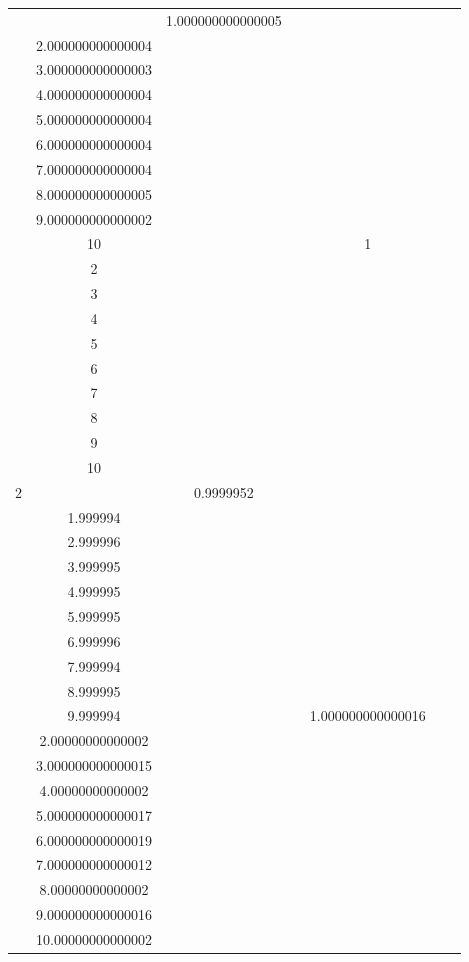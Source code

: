\documentclass[oneside, final, 12pt]{extarticle}
\begin{document}
\begin{longtable}{|c|c|c|c|c|c|c|}
& \( \begin{aligned}
& 1.000000000000005 \\ & 2.000000000000004 \\ & 3.000000000000003 \\ & 4.000000000000004 \\ & 5.000000000000004 \\ & 6.000000000000004 \\ & 7.000000000000004 \\ & 8.000000000000005 \\ & 9.000000000000002 \\ & 10 
\end{aligned} \)
& \( \begin{aligned}  \end{aligned} \) 
& \( \begin{aligned}
& 1 \\ & 2 \\ & 3 \\ & 4 \\ & 5 \\ & 6 \\ & 7 \\ & 8 \\ & 9 \\ & 10 
\end{aligned} \)
& \( \begin{aligned}  \end{aligned} \) 
\\ \hline
    \(2\) & \( \begin{aligned}
& 0.9999952 \\ & 1.999994 \\ & 2.999996 \\ & 3.999995 \\ & 4.999995 \\ & 5.999995 \\ & 6.999996 \\ & 7.999994 \\ & 8.999995 \\ & 9.999994 
\end{aligned} \)
& \( \begin{aligned}  \end{aligned} \) 
& \( \begin{aligned}
& 1.000000000000016 \\ & 2.00000000000002 \\ & 3.000000000000015 \\ & 4.00000000000002 \\ & 5.000000000000017 \\ & 6.000000000000019 \\ & 7.000000000000012 \\ & 8.00000000000002 \\ & 9.000000000000016 \\ & 10.00000000000002 

\end{aligned}
\end{longtable}
\end{document}
